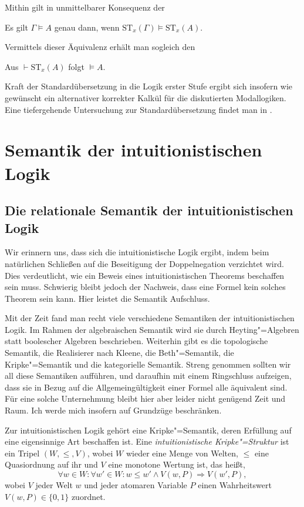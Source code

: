 \noindent
Mithin gilt in unmittelbarer Konsequenz der
\begin{Satz}
Es gilt $\Gamma\models A$ genau dann, wenn
$\mathrm{ST}_x(\Gamma)\models\mathrm{ST}_x(A)$.
\end{Satz}
Vermittels dieser Äquivalenz erhält man sogleich den
\begin{Satz}
Aus $\vdash\mathrm{ST}_x(A)$ folgt $\models A$.
\end{Satz}
Kraft der Standardübersetzung in die Logik erster Stufe ergibt sich
insofern wie gewünscht ein alternativer korrekter Kalkül für die
diskutierten Modallogiken. Eine tiefergehende Untersuchung zur
Standardübersetzung findet man in \cite{Blackburn}.

\section{Semantik der intuitionistischen Logik}

\subsection{Die relationale Semantik der intuitionistischen Logik}

Wir erinnern uns, dass sich die intuitionistische Logik ergibt, indem
beim natürlichen Schließen auf die Beseitigung der Doppelnegation
verzichtet wird. Dies verdeutlicht, wie ein Beweis eines intuitionistischen
Theorems beschaffen sein muss. Schwierig bleibt jedoch der Nachweis, dass
eine Formel kein solches Theorem sein kann. Hier leistet die Semantik
Aufschluss.

Mit der Zeit fand man recht viele verschiedene Semantiken der
intuitionistischen Logik.\cite{Artemov} Im Rahmen der algebraischen
Semantik wird sie durch Heyting"=Algebren statt boolescher Algebren
beschrieben. Weiterhin gibt es die topologische Semantik, die
Realisierer nach Kleene, die Beth"=Semantik, die Kripke"=Semantik
und die kategorielle Semantik. Streng genommen sollten wir all diese
Semantiken aufführen, und daraufhin mit einem Ringschluss aufzeigen,
dass sie in Bezug auf die Allgemeingültigkeit einer Formel alle äquivalent
sind. Für eine solche Unternehmung bleibt hier aber leider nicht
genügend Zeit und Raum. Ich werde mich insofern auf Grundzüge beschränken.

Zur intuitionistischen Logik gehört eine Kripke"=Semantik,
deren Erfüllung auf eine eigensinnige Art beschaffen ist.\cite{Kripke-IL}
Eine \emph{intuitionistische Kripke"=Struktur} ist ein Tripel $(W,\le,V)$,
wobei $W$ wieder eine Menge von Welten, $\le$ eine Quasiordnung auf ihr und
$V$ eine monotone Wertung ist, das heißt,
\[\forall w\in W\colon\forall w'\in W\colon w\le w'\land V(w,P)\Rightarrow V(w',P),\]
wobei $V$ jeder Welt $w$ und jeder atomaren Variable $P$ einen
Wahrheitswert $V(w,P)\in\{0,1\}$ zuordnet.

